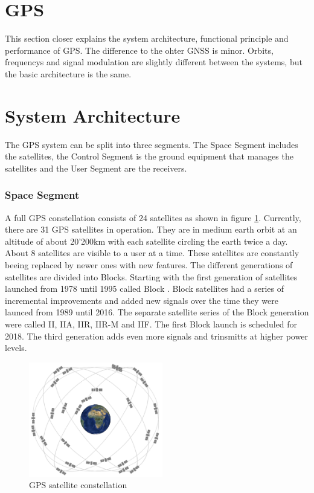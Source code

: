 \section{GPS}

This section closer explains the system architecture, functional principle and performance of GPS.
The difference to the ohter GNSS is minor.
Orbits, frequencys and signal modulation are slightly different between the systems, but the basic architecture is the same.


\section{System Architecture}

The GPS system can be split into three segments.
The Space Segment includes the satellites, the Control Segment is the ground equipment that manages the satellites and the User Segment are the receivers.

\subsubsection{Space Segment}

A full GPS constellation consists of 24 satellites as shown in figure \ref{fig:constellation}.
Currently, there are 31 GPS satellites in operation.
They are in medium earth orbit at an altitude of about 20'200km with each satellite circling the earth twice a day.
About 8 satellites are visible to a user at a time.
These satellites are constantly beeing replaced by newer ones with new features.
The different generations of satellites are divided into Blocks.
Starting with the first generation of satellites launched from 1978 until 1995 called Block .
Block  satellites had a series of incremental improvements and added new signals over the time they were launced from 1989 until 2016.
The separate satellite series of the Block  generation were called II, IIA, IIR, IIR-M and IIF.
The first Block  launch is scheduled for 2018.
The third generation adds even more signals and trinsmitts at higher power levels.

\begin{figure}[ht]
 \centering
 \includegraphics[height=5cm]{images/constellation.jpg}
 \caption{GPS satellite constellation \cite{GPS_GOV}}
 \label{fig:constellation}
\end{figure}

